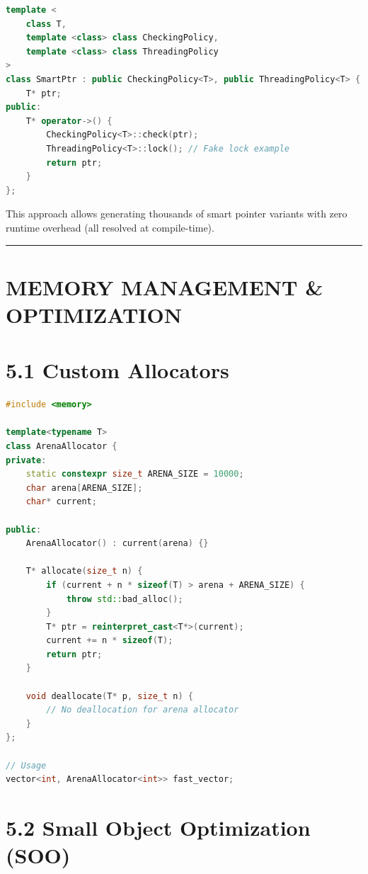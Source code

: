 \begin{lstlisting}[language={C++}]
template <
    class T,
    template <class> class CheckingPolicy,
    template <class> class ThreadingPolicy
>
class SmartPtr : public CheckingPolicy<T>, public ThreadingPolicy<T> {
    T* ptr;
public:
    T* operator->() {
        CheckingPolicy<T>::check(ptr);
        ThreadingPolicy<T>::lock(); // Fake lock example
        return ptr;
    }
};
\end{lstlisting}

This approach allows generating thousands of smart pointer variants with
zero runtime overhead (all resolved at compile-time).

\begin{center}\rule{0.5\linewidth}{0.5pt}\end{center}

\hypertarget{memory-management-optimization}{%
\section{MEMORY MANAGEMENT \&
OPTIMIZATION}\label{memory-management-optimization}}

\hypertarget{custom-allocators}{%
\section{5.1 Custom Allocators}\label{custom-allocators}}

\begin{lstlisting}[language={C++}]
#include <memory>

template<typename T>
class ArenaAllocator {
private:
    static constexpr size_t ARENA_SIZE = 10000;
    char arena[ARENA_SIZE];
    char* current;
    
public:
    ArenaAllocator() : current(arena) {}
    
    T* allocate(size_t n) {
        if (current + n * sizeof(T) > arena + ARENA_SIZE) {
            throw std::bad_alloc();
        }
        T* ptr = reinterpret_cast<T*>(current);
        current += n * sizeof(T);
        return ptr;
    }
    
    void deallocate(T* p, size_t n) {
        // No deallocation for arena allocator
    }
};

// Usage
vector<int, ArenaAllocator<int>> fast_vector;
\end{lstlisting}

\hypertarget{small-object-optimization-soo}{%
\section{5.2 Small Object Optimization
(SOO)}\label{small-object-optimization-soo}}


